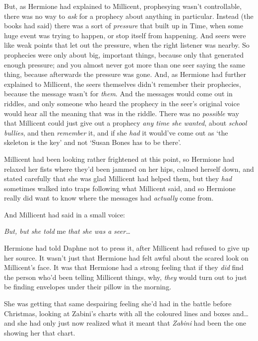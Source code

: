 But, as Hermione had explained to Millicent, prophesying wasn’t controllable, there was no way to \emph{ask} for a prophecy about anything in particular. Instead (the books had said) there was a sort of \emph{pressure} that built up in Time, when some huge event was trying to happen, or stop itself from happening. And seers were like weak points that let out the pressure, when the right listener was nearby. So prophecies were only about big, important things, because only that generated enough pressure; and you almost never got more than one seer saying the same thing, because afterwards the pressure was gone. And, as Hermione had further explained to Millicent, the seers themselves didn’t remember their prophecies, because the message wasn’t for \emph{them}. And the messages would come out in riddles, and only someone who heard the prophecy in the seer’s original voice would hear all the meaning that was in the riddle. There was no \emph{possible} way that Millicent could just give out a prophecy \emph{any time she wanted}, about \emph{school bullies}, and then \emph{remember} it, and if she \emph{had} it would’ve come out as ‘the skeleton is the key’ and not ‘Susan Bones has to be there’.

Millicent had been looking rather frightened at this point, so Hermione had relaxed her fists where they’d been jammed on her hips, calmed herself down, and stated carefully that she was glad Millicent had helped them, but they \emph{had} sometimes walked into traps following what Millicent said, and so Hermione really did want to know where the messages had \emph{actually} come from.

And Millicent had said in a small voice:

\emph{But, but she told} me \emph{that she was a seer…}

Hermione had told Daphne not to press it, after Millicent had refused to give up her source. It wasn’t just that Hermione had felt awful about the scared look on Millicent’s face. It was that Hermione had a strong feeling that if they \emph{did} find the person who’d been telling Millicent things, why, \emph{they} would turn out to just be finding envelopes under their pillow in the morning.

She was getting that same despairing feeling she’d had in the battle before Christmas, looking at Zabini’s charts with all the coloured lines and boxes and…and she had only just now realized what it meant that \emph{Zabini} had been the one showing her that chart.

